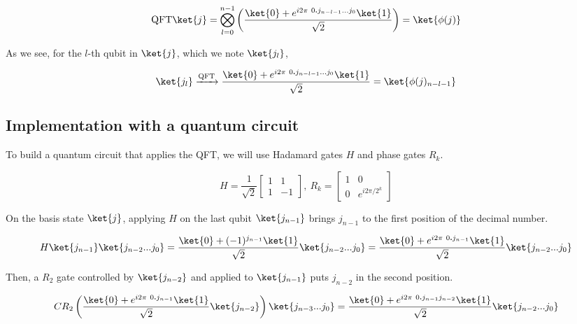 \begin{equation}
    \text{QFT}\ket{j} = \bigotimes_{l=0}^{n-1}\left(\frac{\ket{0} + e^{i 2\pi \ 0\textbf{.}j_{n-l-1}...j_0}\ket{1}}{\sqrt{2}}\right) = \ket{\phi(j)}
    \label{qft_product_state}
\end{equation}

As we see, for the $l$-th qubit in $\ket{j}$, which we note $\ket{j_l}$,

\begin{equation}
    \ket{j_l} \xrightarrow{\text{QFT}} \frac{\ket{0} + e^{i 2\pi \ 0\textbf{.}j_{n-l-1}...j_0}\ket{1}}{\sqrt{2}} = \ket{\phi(j)_{n-l-1}}
    \label{qft_lth_state}
\end{equation}

\subsection{Implementation with a quantum circuit}
To build a quantum circuit that applies the QFT, we will use Hadamard gates $H$ and phase gates $R_k$.

\begin{equation}
    H = \frac{1}{\sqrt{2}}\begin{bmatrix}
        1 & 1 \\
        1 & -1
    \end{bmatrix}, \ R_k = \begin{bmatrix}
        1 & 0 \\
        0 & e^{i 2\pi / 2^k}
    \end{bmatrix}
    \label{hadamard_phase_gate}
\end{equation}

On the basis state $\ket{j}$, applying $H$ on the last qubit $\ket{j_{n-1}}$ brings $j_{n-1}$ to the first position of the decimal number.

\begin{equation*}
    H\ket{j_{n-1}} \ket{j_{n-2}...j_0} = \frac{\ket{0} + (-1)^{j_{n-1}}\ket{1}}{\sqrt{2}}\ket{j_{n-2}...j_0} = \frac{\ket{0} + e^{i 2\pi \ 0\textbf{.}j_{n-1}}\ket{1}}{\sqrt{2}}\ket{j_{n-2}...j_0}
\end{equation*}

Then, a $R_2$ gate controlled by $\ket{j_{n-2}}$ and applied to $\ket{j_{n-1}}$ puts $j_{n-2}$ in the second position.

\begin{equation*}
    CR_2 \left(\frac{\ket{0} + e^{i 2\pi \ 0\textbf{.}j_{n-1}}\ket{1}}{\sqrt{2}}\ket{j_{n-2}}\right)\ket{j_{n-3}...j_0} = \frac{\ket{0} + e^{i 2\pi \ 0\textbf{.}j_{n-1}j_{n-2}}\ket{1}}{\sqrt{2}} \ket{j_{n-2}...j_0}
\end{equation*}

